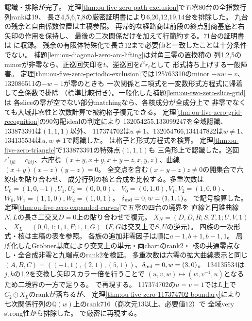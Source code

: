 \documentclass[11pt,a4paper]{ltjsarticle}
\begin{document}
認識・排除が完了。
定理\ref{thm:ou-five-zero-path-exclusion}で五零80台の全指数行列rankは19、
長さ4,5,6,7,8の厳密証明書により6,20,12,19,14台を排除した。
九台の残余と自由係数位置は主稿参照。
再帰的な経路商は前段の終点別商基底と右矢印の作用を保持し、
最後の二次関係だけを加えて行簡約する。71台の証明書は
に収録。
残余の有限体特殊化で長さ12まで必要値と一致したことは十分条件でない。
補題\ref{lem:ou-diagonal-zero-arc-lifting}は対角三零の置換積の
列1,2,5のminorが非零なら、正巡回矢印を$t$、逆巡回を$t^2r_i$として
形式持ち上げする一般障害。
定理\ref{thm:ou-five-zero-periodic-exclusion}では125763310のminor
$-uw-v$、132086511の$-w-1$が零のときも
一次関係と二項式を一変数形式方程式に帰着して全係数で排除
（標準比較付き）。一般化した補題\ref{lem:ou-two-zero-slice-grid}は
各sliceの零が空でない部分matchingなら、各核成分が全成分上で
非零でなくても大域非零性と次数計算で被約格子復元できる。
定理\ref{thm:ou-five-zero-grid-recognition}の90勾配idealの判定により
132054255,133099247を全域認識、133873391は$(1,1,1)$以外、
117374702は$u\ne1$、132054766,134147822は$w\ne1$、
134135534は$u,w\ne1$で認識した。
は格子と形式方程式を検算。
定理\ref{thm:ou-five-zero-triangle}で133873391の特殊点$(1,1,1)$も
三角形上で認識した。巡回$c'_{ijk}=c_{kij}$、六座標
$(x+y,x+y,x+y-z,x,y,z)$、曲線$(x+y)(x-z)(y-z)=0$。
全交点を含む$(x+y-z)z\ne0$の開集合で六線束を貼り合わせ、
成分行列の核と合成を比較する。多重次数は
$U_0=(1,0,-1),U_1,U_2=(0,0,0)$、
$V_0=(0,1,0),V_1,V_2=(1,0,0)$、
$W_0,W_1=(1,1,0),W_2=(1,0,1)$。
$\delta_{\rm md}=0,w=(1,1,1)$。
で記号検算した。
定理\ref{thm:ou-five-zero-expanded-curves}で五零の四台の境界を
直線と円錐曲線$N,L$の長さ二交叉$D=0$上の貼り合わせで復元。
$X_N=(D,D,R;S,T,1;U,V,1)$、
$X_L=(0,0,1;1,1,F;1,1,G)$（$F,G$は交叉上で$S,U$の逆元）。
四族の一次形式・核は主稿の表を参照。
各族の追加非零因子は順に$a-1,b+1,b-1,1$。
局所化したGröbner基底により交叉上の単元・両chartのrank2・
核の共通零点なし・全合成非零と九端点のrank2を検証。
多重次数は六零の拡大曲線表示と同じ
$(A,B,C)=((-1,1),(2,1),(5,1))$、$\delta_{\rm md}=0,w=(3,0)$。
134135534は$j,k$の1,2を交換し矢印スカラー倍を行うことで
$(u,v,w)\mapsto(w,v^{-1},u)$となるため二境界の一方で足りる。
で再現する。
117374702の$u=v=1$では$L$上で$C_2\odot X_L$のrankが落ちるが、
定理\ref{thm:ou-five-zero-117374702-boundary}により
七次関係行列の$\mathbb Q(w)$上のrank716（商次元13以上、必要値12）で
全域very strong性から排除した。
で厳密に再現する。
\end{document}
